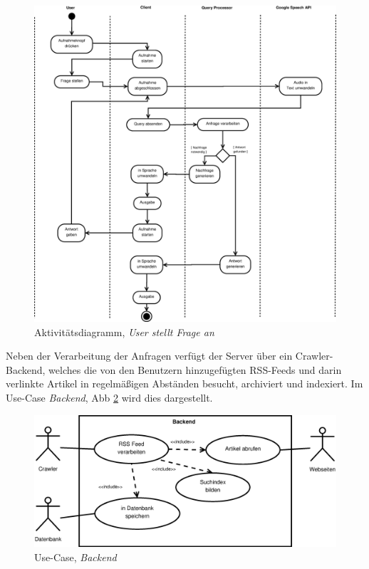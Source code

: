 \begin{figure}[h]
\centering
\includegraphics[width=1\textwidth]{Pflichtenheft/03_produktuebersicht/ablauf_frage}
\caption{Aktivitätsdiagramm, \textit{User stellt Frage an \NewsGenie}
\label{akt-frage}}
\end{figure}

\FloatBarrier

Neben der Verarbeitung der Anfragen verfügt der Server über ein Crawler-Backend,
welches die von den Benutzern hinzugefügten RSS-Feeds und darin verlinkte
Artikel in regelmäßigen Abständen besucht, archiviert und indexiert. Im Use-Case
\textit{Backend}, Abb \ref{uc-backend} wird dies dargestellt.

\begin{figure}[h]
\centering
\includegraphics[width=1\textwidth]{Pflichtenheft/03_produktuebersicht/backend}
\caption{Use-Case, \textit{Backend} \label{uc-backend}}
\end{figure}

